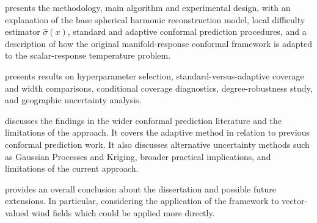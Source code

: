  presents the methodology, main algorithm and experimental design, with an explanation of the base spherical harmonic reconstruction model, local difficulty estimator $\hat{\sigma}(x)$, standard and adaptive conformal prediction procedures, and a description of how the original manifold-response conformal framework is adapted to the scalar-response temperature problem. 

 presents results on hyperparameter selection, standard-versus-adaptive coverage and width comparisons, conditional coverage diagnostics, degree-robustness study, and geographic uncertainty analysis.

 discusses the findings in the wider conformal prediction literature and the limitations of the approach. It covers the adaptive method in relation to previous conformal prediction work. It also discusses alternative uncertainty methods such as Gaussian Processes and Kriging, broader practical implications, and limitations of the current approach.

 provides an overall conclusion about the dissertation and possible future extensions. In particular, considering the application of the framework to vector-valued wind fields which could be applied more directly. 

